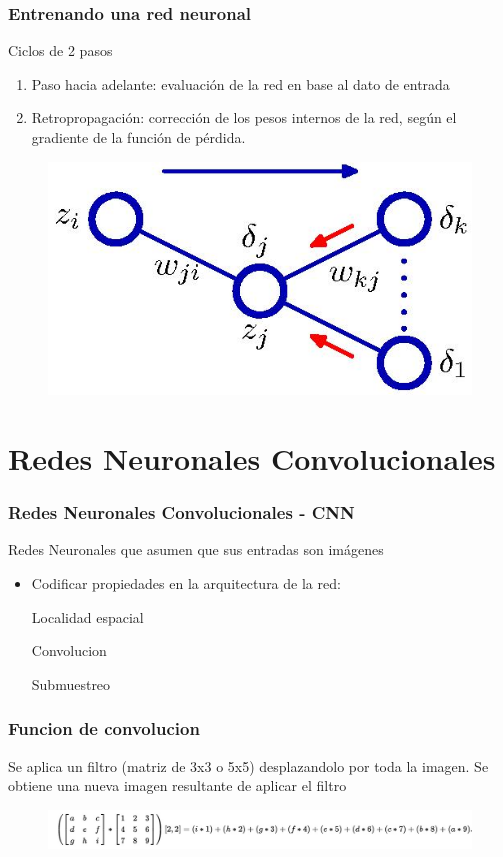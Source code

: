 \documentclass[12pt,center]{beamer}
\newcommand{\subitem}{\par\qquad}
\begin{document}
\begin{frame}
    \frametitle{Entrenando una red neuronal}
    Ciclos de 2 pasos
    \begin{enumerate}
      \item Paso hacia adelante: evaluación de la red en base al dato de entrada
      \item Retropropagación: corrección de los pesos internos de la red, según el gradiente de la función de pérdida.
    \end{enumerate}

    \begin{figure}[ht]
      \begin{center}
      \includegraphics[width=0.5\linewidth]{./img/bishop_backpropagation.jpg}
      \end{center}
    \end{figure}
\end{frame}


\section{Redes Neuronales Convolucionales}
\begin{frame}
  \frametitle{Redes Neuronales Convolucionales - CNN}
    Redes Neuronales que asumen que sus entradas son imágenes
    \begin{itemize}
      \item Codificar propiedades en la arquitectura de la red:
	\subitem Localidad espacial
	\subitem Convolucion
	\subitem Submuestreo
    \end{itemize}
    
\end{frame}
  
\begin{frame}
  \frametitle{Funcion de convolucion}
    Se aplica un filtro (matriz de 3x3 o 5x5) desplazandolo por toda la imagen.
    Se obtiene una nueva imagen resultante de aplicar el filtro
    \begin{figure}[h]
      \begin{center}
      \includegraphics[width=\textwidth]{./img/convolution_wiki.jpg}
      \end{center}
    \end{figure}
\end{frame}
  
\end{document}
